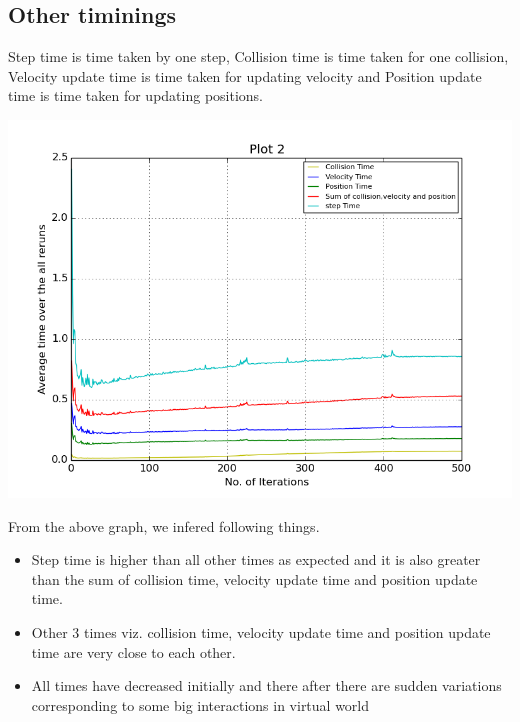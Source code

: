 \documentclass[11pt]{article}
\begin{document}
\subsection{Other timinings}
Step time is time taken by one step, Collision time is time taken for one collision, Velocity update time is time taken for updating velocity and Position update time is time taken for updating positions.
\begin{center}
\includegraphics[scale=0.5]{g12_plot02}
\end{center}
From the above graph, we infered following things.
\begin{itemize}
\item Step time is higher than all other times as expected and it is also greater than the sum of collision time, velocity update time and position update time.
\item Other 3 times viz. collision time, velocity update time and position update time are very close to each other.
\item All times have decreased initially and there after there are sudden variations corresponding to some big interactions in virtual world
\end{itemize}
\end{document}
